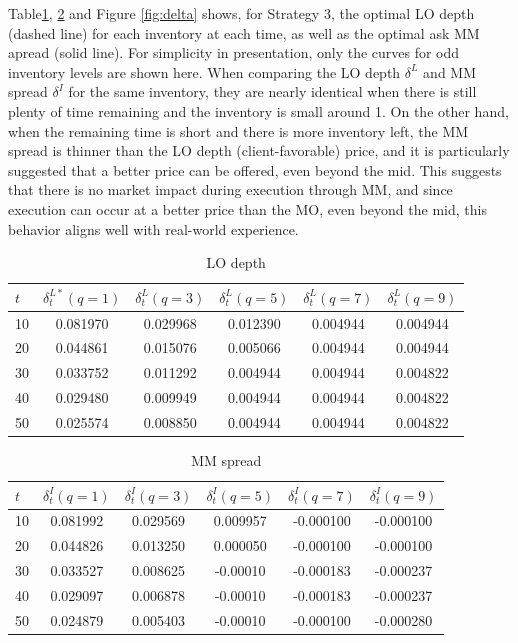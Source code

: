 \documentclass[12pt]{article}
\begin{document}
Table\ref{tab:delta_l}, \ref{tab:delta_i} and Figure \ref{fig:delta} shows, for Strategy 3, the optimal LO depth (dashed line) for each inventory at each time, 
as well as the optimal ask MM apread (solid line).
For simplicity in presentation, only the curves for odd inventory levels are shown here.
When comparing the LO depth $\delta^L$ and MM spread $\delta^I$ for the same inventory, 
they are nearly identical when there is still plenty of time remaining and the inventory is small around 1. 
On the other hand, when the remaining time is short and there is more inventory left, the MM spread is thinner than the LO depth (client-favorable) price, and it is particularly suggested that a better price can be offered, even beyond the mid.
This suggests that there is no market impact during execution through MM, and since execution can occur at a better price than the MO, even beyond the mid, this behavior aligns well with real-world experience.

\begin{table}[H]
  \centering
  \caption{LO depth}
  \label{tab:delta_l}
  \begin{tabular}{lccccc} %
  \hline
  $t$ & $\delta_t^{L*}(q=1)$ & $\delta_t^L(q=3)$ & $\delta_t^L(q=5)$ & $\delta_t^L(q=7)$ & $\delta_t^L(q=9)$ \\
  \hline
  10& 0.081970	& 0.029968	& 0.012390	& 0.004944	& 0.004944 \\
  20& 0.044861	& 0.015076	& 0.005066	& 0.004944	& 0.004944 \\
  30& 0.033752	& 0.011292	& 0.004944	& 0.004944	& 0.004822 \\
  40& 0.029480	& 0.009949	& 0.004944	& 0.004944	& 0.004822 \\
  50& 0.025574	& 0.008850	& 0.004944	& 0.004944	& 0.004822 \\
  \hline
  \end{tabular}
\end{table}


\begin{table}[H]
  \centering
  \caption{MM spread}
  \label{tab:delta_i}
  \begin{tabular}{lccccc} 
  \hline
  $t$ & $\delta_t^I(q=1)$ & $\delta_t^I(q=3)$ & $\delta_t^I(q=5)$ & $\delta_t^I(q=7)$ & $\delta_t^I(q=9)$ \\
  \hline
  10& 0.081992	& 0.029569	& 0.009957	&-0.000100  &-0.000100 \\
  20& 0.044826	& 0.013250	& 0.000050	&-0.000100  &-0.000100 \\
  30& 0.033527	& 0.008625	& -0.00010  &-0.000183 &-0.000237 \\
  40& 0.029097	& 0.006878	& -0.00010  &-0.000183 &-0.000237 \\
  50& 0.024879	& 0.005403	& -0.00010  &-0.000100 &-0.000280 \\
  \hline
  \end{tabular}
\end{table}
\end{document}
